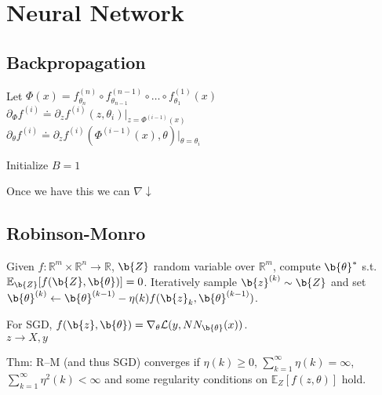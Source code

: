 
\section{Neural Network}
\subsection*{Backpropagation}
Let $\Phi(x) = f^{(n)}_{\theta_n}\circ f^{(n-1)}_{\theta_{n-1}}\circ \dots \circ f^{(1)}_{\theta_{1}}(x)$\\
$\partial_{\Phi}f^{(i)}\doteq\partial_z f^{(i)}(z,\theta_i)\vert_{z=\Phi^{(i-1)}(x)}$\\
$\partial_{\theta}f^{(i)}\doteq\partial_z f^{(i)}(\Phi^{(i-1)}(x),\theta)\vert_{\theta = \theta_i}$

\begin{algorithm}[H]
    Initialize $B = 1$\;
    \end{algorithm}
Once we have this we can $\nabla \downarrow$ 

\subsection*{Robinson-Monro}
Given $f \colon \mathbb{R}^m \times \mathbb{R}^n \rightarrow \mathbb{R}$, $\b{Z}$ random variable over $\mathbb{R}^m$,
compute $\b{\theta}^*$ s.t. $\mathbb{E}_{\b{Z}}[f(\b{Z}, \b{\theta})] = 0$.
Iteratively sample $\b{z}^{(k)} \sim \b{Z}$
and set $\b{\theta}^{(k)} \leftarrow \b{\theta}^{(k-1)} - \eta(k) f(\b{z}_k, \b{\theta}^{(k-1)})$.

For SGD, $f(\b{z}, \b{\theta}) = \nabla_{\theta} \mathcal{L}(y, NN_{\b{\theta}}(x))$.\\
$z \rightarrow X,y$


Thm: R--M (and thus SGD) converges if
$\eta(k) \geq 0$,
$\sum_{k=1}^\infty \eta(k) = \infty$,
$\sum_{k=1}^\infty \eta^2(k) < \infty$
and some regularity conditions on $\mathbb{E}_{Z}[f(z, \theta)]$ hold.


